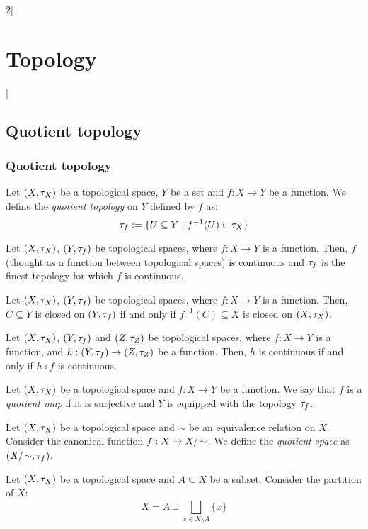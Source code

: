\documentclass[../../../main.tex]{subfiles}
\begin{document}
\begin{multicols}{2}[\section{Topology}]
  \subsection{Quotient topology}
  \subsubsection{Quotient topology}
  \begin{definition}
    Let $(X,\tau_X)$ be a topological space, $Y$ be a set and $f:X\rightarrow Y$ be a function. We define the \textit{quotient topology} on $Y$ defined by $f$ as: $$\tau_f:=\{U\subseteq Y:f^{-1}(U)\in\tau_X\}$$
  \end{definition}
  \begin{prop}
    Let $(X,\tau_X)$, $(Y,\tau_f)$ be topological spaces, where $f:X\rightarrow Y$ is a function. Then, $f$ (thought as a function between topological spaces) is continuous and $\tau_f$ is the finest topology for which $f$ is continuous.
  \end{prop}
  \begin{prop}
    Let $(X,\tau_X)$, $(Y,\tau_f)$ be topological spaces, where $f:X\rightarrow Y$ is a function. Then, $C\subseteq Y$ is closed on $(Y,\tau_f)$ if and only if $f^{-1}(C)\subseteq X$ is closed on $(X,\tau_X)$.
  \end{prop}
  \begin{prop}
    Let $(X,\tau_X)$, $(Y,\tau_f)$ and $(Z,\tau_Z)$ be topological spaces, where $f:X\rightarrow Y$ is a function, and $h:(Y,\tau_f)\rightarrow(Z,\tau_Z)$ be a function. Then, $h$ is continuous if and only if $h\circ f$ is continuous.
  \end{prop}
  \begin{definition}
    Let $(X,\tau_X)$ be a topological space and $f:X\rightarrow Y$ be a function. We say that $f$ is a \textit{quotient map} if it is surjective and $Y$ is equipped with the topology $\tau_f$.
  \end{definition}
  \begin{definition}
    Let $(X,\tau_X)$ be a topological space and $\sim$ be an equivalence relation on $X$. Consider the canonical function $f:X\rightarrow\quot{X}{\!\sim}$. We define the \textit{quotient space} as $(\quot{X}{\!\sim},\topo_f)$.
  \end{definition}
  \begin{definition}
    Let $(X,\tau_X)$ be a topological space and $A\subseteq X$ be a subset. Consider the partition of $X$: $$X=A\sqcup\bigsqcup_{x\in X\setminus A}\{x\}$$

\end{definition}
\end{multicols}
\end{document}
